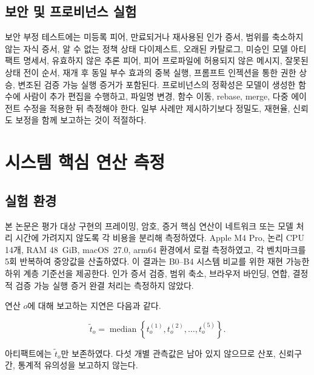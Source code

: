 \documentclass[10pt]{article}
\begin{document}
\subsection{보안 및 프로비넌스 실험}

보안 부정 테스트에는 미등록 피어, 만료되거나 재사용된 인가 증서, 범위를 축소하지 않는 자식 증서, 알 수 없는 정책 상태 다이제스트, 오래된 카탈로그, 미승인 모델 아티팩트 명세서, 유효하지 않은 추론 피어, 피어 프로파일에 허용되지 않은 메시지, 잘못된 상태 전이 순서, 재개 후 동일 부수 효과의 중복 실행, 프롬프트 인젝션을 통한 권한 상승, 변조된 검증 가능 실행 증거가 포함된다. 프로비넌스의 정확성은 모델이 생성한 함수에 사람이 추가 편집을 수행하고, 파일명 변경, 함수 이동, rebase, merge, 다중 에이전트 수정을 적용한 뒤 측정해야 한다. 일부 사례만 제시하기보다 정밀도, 재현율, 신뢰도 보정을 함께 보고하는 것이 적절하다.

\section{시스템 핵심 연산 측정}

\subsection{실험 환경}

본 논문은 평가 대상 구현의 프레이밍, 암호, 증거 핵심 연산이 네트워크 또는 모델 처리 시간에 가려지지 않도록 각 비용을 분리해 측정하였다. Apple M4 Pro, 논리 CPU 14개, RAM 48~GiB, macOS~27.0, arm64 환경에서 로컬 측정하였고, 각 벤치마크를 5회 반복하여 중앙값을 산출하였다. 이 결과는 B0--B4 시스템 비교를 위한 재현 가능한 하위 계층 기준선을 제공한다. 인가 증서 검증, 범위 축소, 브라우저 바인딩, 연합, 결정적 검증 가능 실행 증거 완결 처리는 측정하지 않았다.

연산 $o$에 대해 보고하는 지연은 다음과 같다.

\begin{equation}
\widetilde{t}_o = \operatorname{median}
  \left\{t_o^{(1)},t_o^{(2)},\ldots,t_o^{(5)}\right\}.
\label{eq:median}
\end{equation}

아티팩트에는 $\widetilde{t}_o$만 보존하였다. 다섯 개별 관측값은 남아 있지 않으므로 산포, 신뢰구간, 통계적 유의성을 보고하지 않는다.
\end{document}
